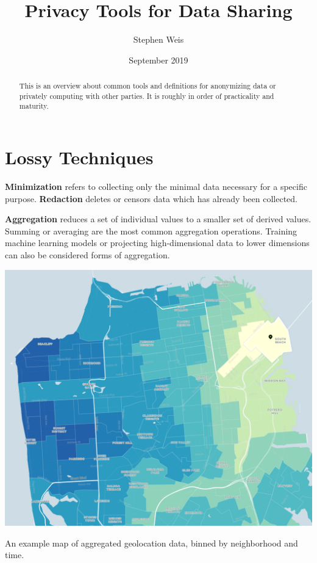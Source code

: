 \documentclass[nobib]{tufte-handout}
\title{Privacy Tools for Data Sharing}
\author[Stephen Weis]{Stephen Weis}
\date{September 2019} %
\begin{document}
\maketitle %

\begin{abstract}

\noindent This is an overview about common tools and definitions
for anonymizing data or privately computing with other parties. It is roughly in
order of practicality and maturity. \end{abstract}

\section{Lossy Techniques} \textbf{Minimization} refers to collecting only the
minimal data necessary for a specific purpose. \textbf{Redaction} deletes or
censors data which has already been collected.

\textbf{Aggregation} reduces a set of individual values to a smaller set of
derived values. Summing or averaging are the most common aggregation operations.
Training machine learning models or projecting high-dimensional data to lower
dimensions can also be considered forms of aggregation.

\begin{marginfigure} \includegraphics[width=\linewidth]{binned}
\caption{An example map of aggregated geolocation data, binned by neighborhood
and time.}
\label{fig:binned} \end{marginfigure}
\end{document}
